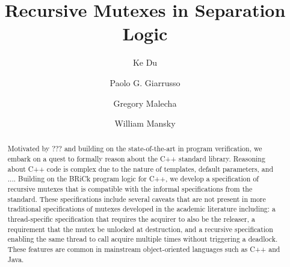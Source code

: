 \documentclass[sigplan,screen]{acmart}
\begin{document}
\title{Recursive Mutexes in Separation Logic}

\author{Ke Du}

\author{Paolo G. Giarrusso}

\author{Gregory Malecha}

\author{William Mansky}

\renewcommand{\shortauthors}{Du et al.}

\newcommand{\mutexR}{\ensuremath{\mathsf{rmutex}}}

\begin{abstract}
  Motivated by ??? and building on the state-of-the-art in program verification, we embark on a quest to formally reason about the C++ standard library.
  Reasoning about C++ code is complex due to the nature of templates, default parameters, and ....
  Building on the BRiCk program logic for C++, we develop a specification of recursive mutexes that is compatible with the informal specifications from the standard.
  These specifications include several caveats that are not present in more traditional specifications of mutexes developed in the academic literature including: a thread-specific specification that requires the acquirer to also be the releaser, a requirement that the mutex be unlocked at destruction, and a recursive specification enabling the same thread to call acquire multiple times without triggering a deadlock.
  These features are common in mainstream object-oriented languages such as C++ and Java.


\end{abstract}
\end{document}
